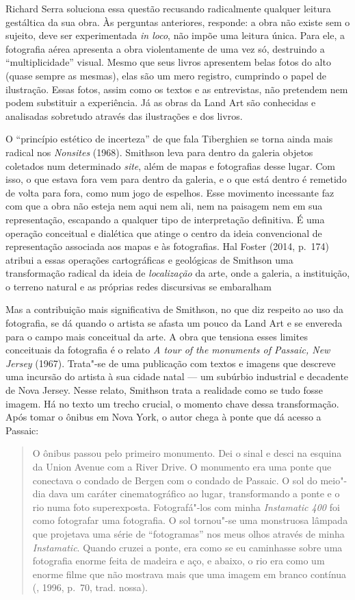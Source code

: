 Richard Serra soluciona essa questão recusando radicalmente qualquer
leitura gestáltica da sua obra. Às perguntas anteriores, responde: a
obra não existe sem o sujeito, deve ser experimentada \emph{in loco},
não impõe uma leitura única. Para ele, a fotografia aérea apresenta a
obra violentamente de uma vez só, destruindo a ``multiplicidade''
visual. Mesmo que seus livros apresentem belas fotos do alto (quase
sempre as mesmas), elas são um mero registro, cumprindo o papel de
ilustração. Essas fotos, assim como os textos e as entrevistas, não
pretendem nem podem substituir a experiência. Já as obras da Land Art
são conhecidas e analisadas sobretudo através das ilustrações e dos
livros.

O ``princípio estético de incerteza'' de que fala Tiberghien se torna
ainda mais radical nos \emph{Nonsites} (1968). Smithson leva para dentro
da galeria objetos coletados num determinado \emph{site}, além de mapas
e fotografias desse lugar. Com isso, o que estava fora vem para dentro
da galeria, e o que está dentro é remetido de volta para fora, como num
jogo de espelhos. Esse movimento incessante faz com que a obra não
esteja nem aqui nem ali, nem na paisagem nem em sua representação,
escapando a qualquer tipo de interpretação definitiva. É uma operação
conceitual e dialética que atinge o centro da ideia convencional de
representação associada aos mapas e às fotografias. Hal Foster (2014, p.~174) atribui a essas operações cartográficas e geológicas de Smithson
uma transformação radical da ideia de \emph{localização} da arte, onde a
galeria, a instituição, o terreno natural e as próprias redes discursivas
se embaralham

Mas a contribuição mais significativa de Smithson, no que diz respeito
ao uso da fotografia, se dá quando o artista se afasta um pouco da Land
Art e se envereda para o campo mais conceitual da arte. A obra que
tensiona esses limites conceituais da fotografia é o relato \emph{A tour
of the monuments of Passaic, New Jersey} (1967). Trata"-se de uma
publicação com textos e imagens que descreve uma incursão do artista à
sua cidade natal --- um subúrbio industrial e decadente de Nova Jersey.
Nesse relato, Smithson trata a realidade como se tudo fosse imagem. Há
no texto um trecho crucial, o momento chave dessa transformação. Após
tomar o ônibus em Nova York, o autor chega à ponte que dá acesso a
Passaic:

\begin{quote}
O ônibus passou pelo primeiro monumento. Dei o sinal e desci na esquina
da Union Avenue com a River Drive. O monumento era uma ponte que
conectava o condado de Bergen com o condado de Passaic. O sol do meio"-dia dava um caráter cinematográfico ao lugar, transformando a ponte e o
rio numa foto superexposta. Fotografá"-los com minha \emph{Instamatic 400} foi
como fotografar uma fotografia. O sol tornou"-se uma monstruosa lâmpada
que projetava uma série de ``fotogramas'' nos meus olhos através de
minha \emph{Instamatic}. Quando cruzei a ponte, era como se eu caminhasse sobre
uma fotografia enorme feita de madeira e aço, e abaixo, o rio era como
um enorme filme que não mostrava mais que uma imagem em branco contínua
(, 1996, p.~70, trad. nossa).
\end{quote}

